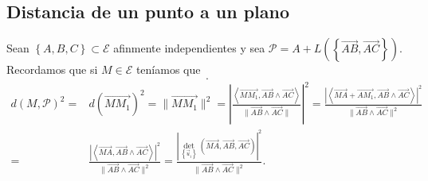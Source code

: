 \subsection*{Distancia de un punto a un plano}
Sean $\displaystyle \left\{ A,B,C\right\} \subset \mathcal{E} $ afinmente independientes y sea $\displaystyle \mathcal{P} = A + L\left( \left\{ \overrightarrow{AB}, \overrightarrow{AC}\right\} \right) $. Recordamos que si $\displaystyle M \in \mathcal{E} $ teníamos que 
\[ .\]
\[
\begin{split}
	d\left(M,\mathcal{P}\right)^{2} = & d\left(\overrightarrow{MM_{1}}\right)^{2} = \|\overrightarrow{MM_{1}}\|^{2} = \left| \frac{\left\langle \overrightarrow{MM_{1}}, \overrightarrow{AB}\land \overrightarrow{AC} \right\rangle }{ \|\overrightarrow{AB}\land \overrightarrow{AC}\|}\right|^{2} = \frac{ \left|\left\langle \overrightarrow{MA}+\overrightarrow{AM_{1}},\overrightarrow{AB}\land\overrightarrow{AC}  \right\rangle \right|^{2}}{ \|\overrightarrow{AB}\land \overrightarrow{AC}\|^{2}} \\
	= & \frac{ \left|\left\langle \overrightarrow{MA}, \overrightarrow{AB}\land \overrightarrow{AC} \right\rangle \right|^{2}}{ \|\overrightarrow{AB}\land \overrightarrow{AC}\|^{2}} = \frac{ \left|\det_{ \left\{ \vec{u}_{i}\right\}} \left(\overrightarrow{MA}, \overrightarrow{AB}, \overrightarrow{AC}\right)\right|^{2}}{ \|\overrightarrow{AB}\land \overrightarrow{AC}\|^{2}}.
\end{split}
\]
